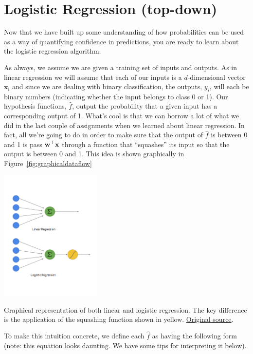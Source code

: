 \documentclass[assignment03_Solutions]{subfiles}
\begin{document}
\section{Logistic Regression (top-down)}
Now that we have built up some understanding of how probabilities can be used as a way of quantifying confidence in predictions, you are ready to learn about the logistic regression algorithm.

As always, we assume we are given a training set of inputs and outputs.  As in linear regression we will assume that each of our inputs is a $d$-dimensional vector $\mathbf{x_i}$ and since we are dealing with binary classification, the outputs, $y_i$, will each be binary numbers (indicating whether the input belongs to class 0 or 1).  Our hypothesis functions, $\hat{f}$, output the probability that a given input has a corresponding output of 1.  What's cool is that we can borrow a lot of what we did in the last couple of assignments when we learned about linear regression.  In fact, all we're going to do in order to make sure that the output of $\hat{f}$ is between 0 and 1 is pass $\mathbf{w}^\top \mathbf{x}$ through a function that ``squashes'' its input so that the output is between 0 and 1.  This idea is shown graphically in Figure~\ref{fig:graphicaldataflow}

\begin{marginfigure}
\includegraphics[width=2in]{figures/linearandlogistic}
\caption{Graphical representation of both linear and logistic regression.  The key difference is the application of the squashing function shown in yellow.  \href{https://towardsdatascience.com/building-a-logistic-regression-in-python-301d27367c24}{Original source}.}\label{fig:graphicaldataflow}
\end{marginfigure}
To make this intuition concrete, we define each $\hat{f}$ as having the following form (note: this equation looks daunting. We have some tips for interpreting it below).
\end{document}
